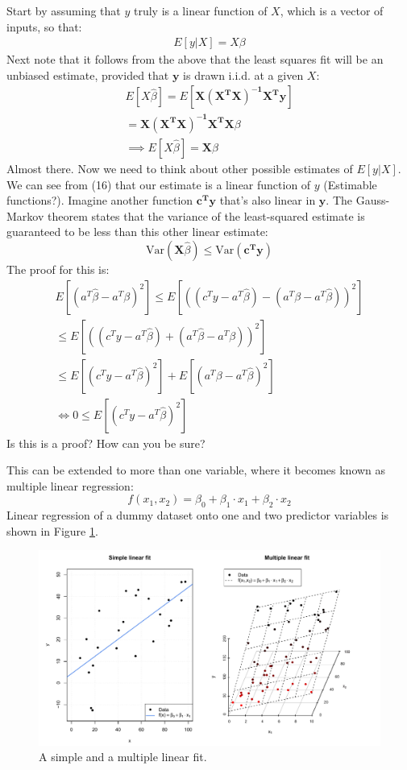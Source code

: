 \documentclass[11pt,a4paper,article]{memoir} %
\begin{document}
Start by assuming that $y$ truly is a linear function of $X$, which is a vector of inputs, so that:
\begin{gather}
	E[y|X] = X\beta 
\end{gather}
Next note that it follows from the above that the least squares fit will be an unbiased estimate, provided that $\boldsymbol{y}$ is drawn i.i.d. at a given $X$:
\begin{gather}
	E[X\hat{\beta}] = E[\boldsymbol{X(X^T X)^{-1}X^T y}] \\
	= \boldsymbol{X(X^T X)^{-1}X^T X}\beta \\
	\implies E[X\hat{\beta}] = \boldsymbol{X}\beta
\end{gather}
Almost there. Now we need to think about other possible estimates of $E[y|X]$. We can see from (16) that our estimate is a linear function of $y$ (Estimable functions?). Imagine another function $\boldsymbol{c^T y}$ that's also linear in $\boldsymbol{y}$. The Gauss-Markov theorem states that the variance of the least-squared estimate is guaranteed to be less than this other linear estimate:
\begin{equation}
	\text{Var}(\boldsymbol{X}\hat{\beta}) \leq \text{Var}(\boldsymbol{c^Ty})
\end{equation} 
The proof for this is:
\begin{gather}
	E[(a^T \hat{\beta} - a^T \beta)^2] \leq E[((c^T y - a^T \hat{\beta}) - ( a^T \beta - a^T \hat{\beta}))^2]\\
	\leq  E[((c^T y - a^T \hat{\beta}) + ( a^T \hat{\beta} - a^T \beta))^2] \\
	\leq E[(c^T y - a^T \hat{\beta})^2] + E[( a^T \beta - a^T \hat{\beta})^2] \\
	\iff 0 \leq E[(c^T y - a^T \hat{\beta})^2]
\end{gather}
Is this is a proof? How can you be sure?

This can be extended to more than one variable, where it becomes known as multiple linear regression:
\begin{equation}
	f(x_1, x_2) = \beta_0 + \beta_1 \cdot x_1 + \beta_2 \cdot x_2
\end{equation}
Linear regression of a dummy dataset onto one and two predictor variables is shown in Figure \ref{fig:linear_regression}. 
\begin{figure}
\includegraphics[width=\textwidth]{linear_fits.pdf}
\caption{A simple and a multiple linear fit.}
\label{fig:linear_regression}
\end{figure}
\end{document}
